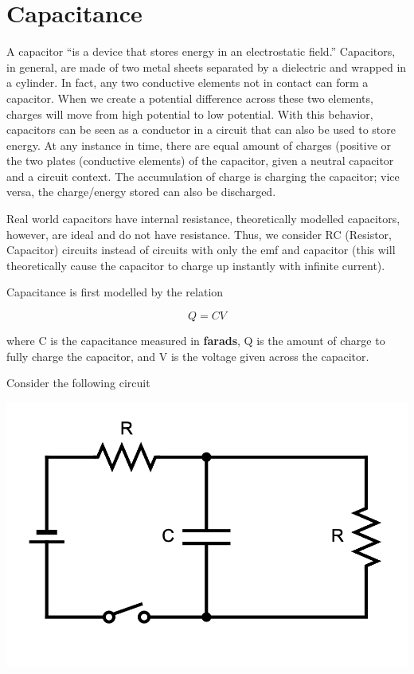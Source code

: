 \chapter{Capacitance}

A capacitor ``is a device that stores energy in an electrostatic field.'' Capacitors, in general, are made of two metal sheets separated by a dielectric and wrapped in a cylinder. In fact, any two conductive elements not in contact can form a capacitor. When we create a potential difference across these two elements, charges will move from high potential to low potential. With this behavior, capacitors can be seen as a conductor in a circuit that can also be used to store energy. At any instance in time, there are equal amount of charges (positive or the two plates (conductive elements) of the capacitor, given a neutral capacitor and a circuit context. The accumulation of charge is charging the capacitor; vice versa, the charge/energy stored can also be discharged.

Real world capacitors have internal resistance, theoretically modelled capacitors, however, are ideal and do not have resistance. Thus, we consider RC (Resistor, Capacitor) circuits instead of circuits with only the emf and capacitor (this will theoretically cause the capacitor to charge up instantly with infinite current).

Capacitance is first modelled by the relation

\[Q = CV\]

where C is the capacitance measured in \textbf{farads}, Q is the amount of charge to fully charge the capacitor, and V is the voltage given across the capacitor.

Consider the following circuit

\begin{center}
    \includegraphics[scale=0.35]{assets/rc-circuit}
\end{center}

